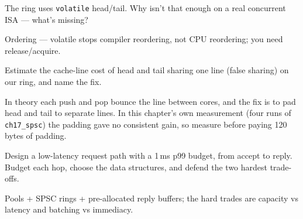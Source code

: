 \begin{exercise}[medium]
The ring uses \texttt{volatile} head/tail. Why isn't that enough
on a real concurrent ISA --- what's missing?
\end{exercise}
\begin{solution}[hint]
Ordering --- volatile stops compiler reordering, not CPU
reordering; you need release/acquire.
\end{solution}
\begin{exercise}[medium]
Estimate the cache-line cost of head and tail sharing one line
(false sharing) on our ring, and name the fix.
\end{exercise}
\begin{solution}[hint]
In theory each push and pop bounce the line between cores, and the
fix is to pad head and tail to separate lines. In this chapter's
own measurement (four runs of \texttt{ch17\_spsc}) the padding gave
no consistent gain, so measure before paying 120 bytes of padding.
\end{solution}
\begin{exercise}[hard]
Design a low-latency request path with a 1\,ms p99 budget, from
accept to reply. Budget each hop, choose the data structures,
and defend the two hardest trade-offs.
\end{exercise}
\begin{solution}[hint]
Pools + SPSC rings + pre-allocated reply buffers; the hard
trades are capacity vs latency and batching vs immediacy.
\end{solution}

